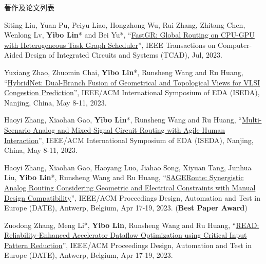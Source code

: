 \begin{rSection}{著作及论文列表}
\begin{description}[font=\normalfont, rightmargin=2em]
{}
            

\item[{[J116]}]{
        Siting Liu, Yuan Pu, Peiyu Liao, Hongzhong Wu, Rui Zhang, Zhitang Chen, Wenlong Lv, \textbf{Yibo Lin}* and Bei Yu*, 
    ``\href{https://doi.org/10.1109/TCAD.2022.3217668}{FastGR: Global Routing on CPU-GPU with Heterogeneous Task Graph Scheduler}'', 
    IEEE Transactions on Computer-Aided Design of Integrated Circuits and Systems (TCAD), Jul, 2023.
    
}
            

\item[{[C115]}]{
        Yuxiang Zhao, Zhuomin Chai, \textbf{Yibo Lin}*, Runsheng Wang and Ru Huang, 
    ``\href{https://doi.org/10.1109/ISEDA59274.2023.10218656}{HybridNet: Dual-Branch Fusion of Geometrical and Topological Views for VLSI Congestion Prediction}'', 
    IEEE/ACM International Symposium of EDA (ISEDA), Nanjing, China, May 8-11, 2023.
    
}
            

\item[{[C114]}]{
        Haoyi Zhang, Xiaohan Gao, \textbf{Yibo Lin}*, Runsheng Wang and Ru Huang, 
    ``\href{https://doi.org/10.1109/ISEDA59274.2023.10218434}{Multi-Scenario Analog and Mixed-Signal Circuit Routing with Agile Human Interaction}'', 
    IEEE/ACM International Symposium of EDA (ISEDA), Nanjing, China, May 8-11, 2023.
    
}
            

\item[{[C113]}]{
        Haoyi Zhang, Xiaohan Gao, Haoyang Luo, Jiahao Song, Xiyuan Tang, Junhua Liu, \textbf{Yibo Lin}*, Runsheng Wang and Ru Huang, 
    ``\href{https://doi.org/10.23919/DATE56975.2023.10137296}{SAGERoute: Synergistic Analog Routing Considering Geometric and Electrical Constraints with Manual Design Compatibility}'', 
    IEEE/ACM Proceedings Design, Automation and Test in Europe (DATE), Antwerp, Belgium, Apr 17-19, 2023.
    (\textbf{Best Paper Award})
}
            

\item[{[C112]}]{
        Zuodong Zhang, Meng Li*, \textbf{Yibo Lin}, Runsheng Wang and Ru Huang, 
    ``\href{https://doi.org/10.23919/DATE56975.2023.10137254}{READ: Reliability-Enhanced Accelerator Dataflow Optimization using Critical Input Pattern Reduction}'', 
    IEEE/ACM Proceedings Design, Automation and Test in Europe (DATE), Antwerp, Belgium, Apr 17-19, 2023.
    
}
            


\end{description}
\end{rSection}
